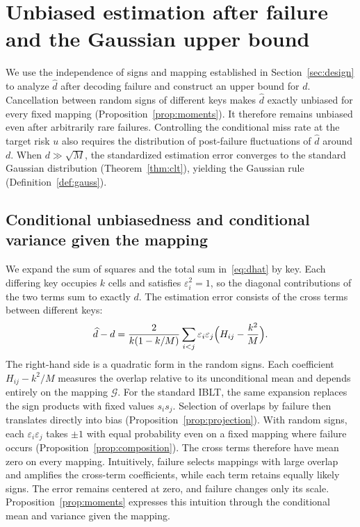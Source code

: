 \section{Unbiased estimation after failure and the Gaussian upper bound}\label{sec:measurement}
We use the independence of signs and mapping established in Section~\ref{sec:design} to analyze $\widehat d$ after decoding failure and construct an upper bound for $d$. Cancellation between random signs of different keys makes $\widehat d$ exactly unbiased for every fixed mapping (Proposition~\ref{prop:moments}). It therefore remains unbiased even after arbitrarily rare failures. Controlling the conditional miss rate at the target risk $u$ also requires the distribution of post-failure fluctuations of $\widehat d$ around $d$. When $d\gg\sqrt M$, the standardized estimation error converges to the standard Gaussian distribution (Theorem~\ref{thm:clt}), yielding the Gaussian rule (Definition~\ref{def:gauss}).

\subsection{Conditional unbiasedness and conditional variance given the mapping}
We expand the sum of squares and the total sum in~\eqref{eq:dhat} by key. Each differing key occupies $k$ cells and satisfies $\varepsilon_i^2=1$, so the diagonal contributions of the two terms sum to exactly $d$. The estimation error consists of the cross terms between different keys:
\begin{equation}
\widehat d-d=\frac{2}{k(1-k/M)}\sum_{i<j}\varepsilon_i\varepsilon_j\Bigl(H_{ij}-\frac{k^2}{M}\Bigr).\label{eq:rs-expand}
\end{equation}
The right-hand side is a quadratic form in the random signs. Each coefficient $H_{ij}-k^2/M$ measures the overlap relative to its unconditional mean and depends entirely on the mapping $\mathcal G$. For the standard IBLT, the same expansion replaces the sign products with fixed values $s_is_j$. Selection of overlaps by failure then translates directly into bias (Proposition~\ref{prop:projection}). With random signs, each $\varepsilon_i\varepsilon_j$ takes $\pm1$ with equal probability even on a fixed mapping where failure occurs (Proposition~\ref{prop:composition}). The cross terms therefore have mean zero on every mapping. Intuitively, failure selects mappings with large overlap and amplifies the cross-term coefficients, while each term retains equally likely signs. The error remains centered at zero, and failure changes only its scale. Proposition~\ref{prop:moments} expresses this intuition through the conditional mean and variance given the mapping.

